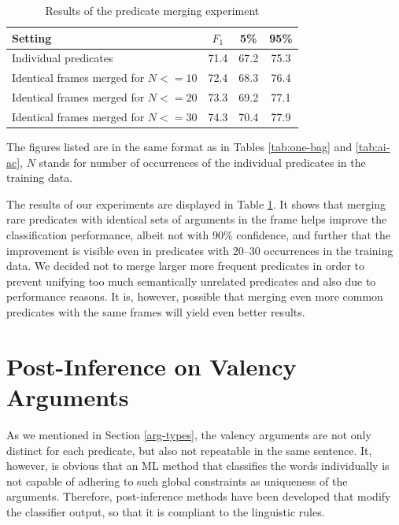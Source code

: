 \documentclass[12pt,notitlepage]{report}
\begin{document}
\begin{table}[htb]\label{tab:merge}
\caption{Results of the predicate merging experiment}\footnotesize
\begin{center}
\begin{tabular}{|l|c|c|c|}\hline
\bf Setting & $F_1$ & \bf 5\% & \bf 95\% \\\hline
Individual predicates & 71.4 & 67.2 & 75.3 \\
Identical frames merged for $N <= 10$ & 72.4 & 68.3 & 76.4 \\
Identical frames merged for $N <= 20$ & 73.3 & 69.2 & 77.1 \\
Identical frames merged for $N <= 30$ & 74.3 & 70.4 & 77.9 \\\hline
\end{tabular}
\end{center}
The figures listed are in the same format as in Tables \ref{tab:one-bag} and \ref{tab:ai-ac}, $N$ stands for number of occurrences of the individual predicates in the training data.
\end{table}

The results of our experiments are displayed in Table \ref{tab:merge}. It shows that merging rare predicates with identical sets of arguments in the frame helps improve the classification performance, albeit not with 90\% confidence, and further that the improvement is visible even in predicates with 20--30 occurrences in the training data. We decided not to merge larger more frequent predicates in order to prevent unifying too much semantically unrelated predicates and also due to performance reasons. It is, however, possible that merging even more common predicates with the same frames will yield even better results.

\section{Post-Inference on Valency Arguments}\label{post-inference}

As we mentioned in Section \ref{arg-types}, the valency arguments are not only distinct for each predicate, but also not repeatable in the same sentence. It, however, is obvious that an ML method that classifies the words individually is not capable of adhering to such global constraints as uniqueness of the arguments. Therefore, post-inference methods have been developed that modify the classifier output, so that it is compliant to the linguistic rules. 
\end{document}
